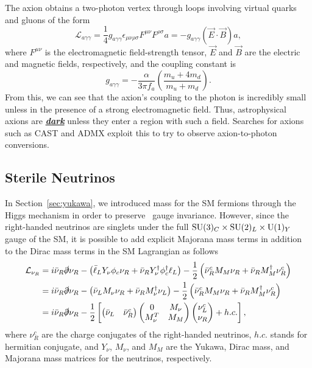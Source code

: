 The axion obtains a two-photon vertex through loops involving virtual quarks and gluons of the form
\begin{equation}
  \mathcal{L}_{a\gamma\gamma} = \frac{1}{4} g_{a\gamma\gamma} \epsilon_{\mu\nu\rho\sigma} F^{\mu\nu} F^{\rho\sigma} a = - g_{a\gamma\gamma} \left(\vec E \cdot \vec B\right) a,
\end{equation}
where $F^{\mu\nu}$ is the electromagnetic field-strength tensor, $\vec E$ and $\vec B$ are the electric and magnetic fields, respectively, and the coupling constant is
\begin{equation}
  g_{a\gamma\gamma} = - \frac{\alpha}{3\pi f_a} \left( \frac{m_u + 4m_d}{m_u + m_d}\right).
\end{equation}
From this, we can see that the axion's coupling to the photon is incredibly small unless in the presence of a strong electromagnetic field.
Thus, astrophysical axions are \underline{\textbf{\textit{dark}}} unless they enter a region with such a field.
Searches for axions such as CAST\cite{} and ADMX\cite{} exploit this to try to observe axion-to-photon conversions.

\subsection{Sterile Neutrinos}
\label{sec:dm_sterile}

In Section~\ref{sec:yukawa}, we introduced mass for the SM fermions through the Higgs mechanism in order to preserve \sutwo\ gauge invariance.
However, since the right-handed neutrinos are singlets under the full $\text{SU}(3)_C \times \text{SU}(2)_L \times \text{U}(1)_Y$ gauge of the SM, it is possible to add explicit Majorana mass terms in addition to the Dirac mass terms in the SM Lagrangian as follows
\begin{align}
  \mathcal{L}_{\nu_R} & = i \bar \nu_R \slashed \partial \nu_R
  - \left( \bar \ell_L Y_\nu \phi_c \nu_R + \bar \nu_R Y_\nu^\dagger \phi_c^\dagger \ell_L \right)
  - \frac{1}{2} \left( \bar \nu_R^c M_M \nu_R + \bar \nu_R M_M^\dagger \nu_R^c \right) \nonumber \\
  & = i \bar \nu_R \slashed \partial \nu_R
  - \left( \bar{{\nu}}_L  M_\nu  \nu_R + \bar{{\nu}}_R  M_\nu^\dagger  \nu_L \right)
  - \frac{1}{2} \left( \bar \nu_R^c M_M \nu_R + \bar \nu_R M_M^\dagger \nu_R^c \right) \nonumber \\
  & = i \bar \nu_R \slashed \partial \nu_R
  - \frac{1}{2} \left[ \begin{pmatrix} \bar \nu_L & \bar \nu_R^c \end{pmatrix}
    \begin{pmatrix} 0 & M_\nu \\ M_\nu^T & M_M \end{pmatrix}
    \begin{pmatrix} \nu_L^c \\ \nu_R \end{pmatrix} + h.c. \right], 
\end{align}
where $\nu_R^c$ are the charge conjugates of the right-handed neutrinos, $h.c.$ stands for hermitian conjugate, and $Y_\nu$, $M_\nu$, and $M_M$ are the Yukawa, Dirac mass, and Majorana mass matrices for the neutrinos, respectively.



